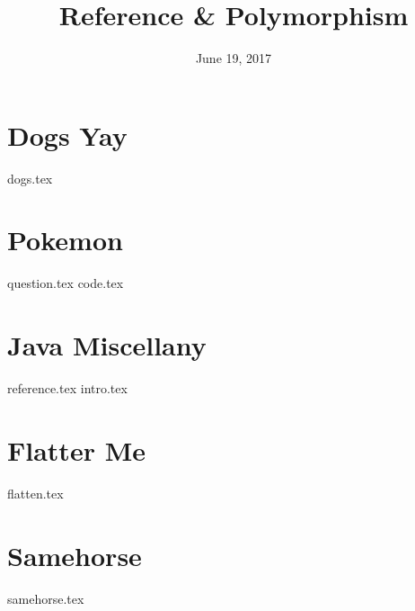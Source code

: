 \documentclass{exam}
\title{Reference \& Polymorphism}
\date{June 19, 2017}
\begin{document}
\maketitle

\section{Dogs Yay}
\begin{questions}
{dogs.tex}
\end{questions}

\clearpage

\section{Pokemon}
\begin{questions}
{question.tex}
{code.tex}
\end{questions}

\clearpage

\section{Java Miscellany}
{reference.tex}
{intro.tex}

\section{Flatter Me}
\begin{questions}
{flatten.tex}
\end{questions}

\clearpage

\section{Samehorse}
\begin{questions}
{samehorse.tex}
\end{questions}
\end{document}
